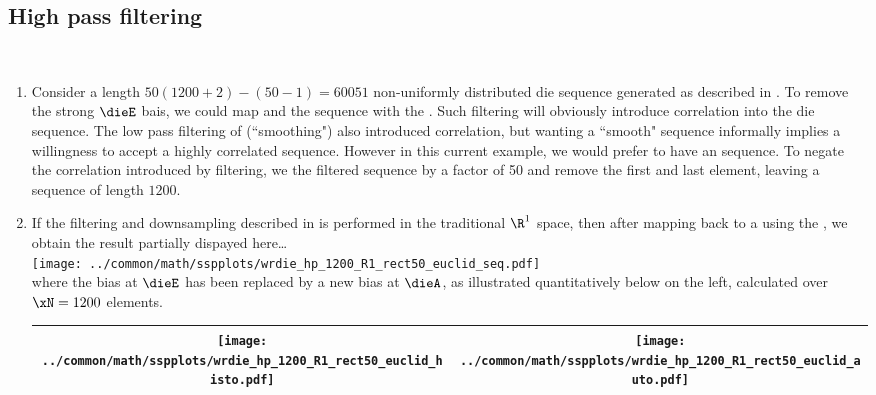 \subsection{High pass filtering}
\label{sec:hp}
\begin{example}
\label{ex:wrdie_hp}
\mbox{}\\
\begin{enumerate}
  \item \label{item:wrdie_hp_R1_rect50}
        Consider a length $50(1200+2)-(50-1)=60051$ non-uniformly distributed die sequence generated as
        described in .
        To remove the strong $\dieE$ bais, we could map and   the sequence with the 
         .
        Such filtering will obviously introduce correlation into the die sequence. 
        The low pass filtering of  (``smoothing") also introduced correlation,
        but wanting a ``smooth" sequence informally implies a willingness to accept a highly correlated sequence.
        However in this current example, we would prefer to have an  sequence.
        To negate the correlation introduced by filtering, 
        we   the filtered sequence by a factor of 50 and
        remove the first and last element, leaving a sequence of length $1200$.

  \item \label{item:wrdie_hp_R1_rect50_euclid}
        If the filtering and downsampling described in  
        is performed in the traditional $\R^1$ space,
        then after mapping back to a  using the ,
        we obtain the result partially dispayed here\ldots
          \\\texttt{[image: ../common/math/sspplots/wrdie\_hp\_1200\_R1\_rect50\_euclid\_seq.pdf]}\\
        where the bias at $\dieE$ has been replaced by a new bias at $\dieA$, 
        as illustrated quantitatively below on the left, 
        calculated over $\xN=1200$ elements. 
          \\\begin{tabular}{|>{\scs}c|>{\scs}c|}
               \hline
               \texttt{[image: ../common/math/sspplots/wrdie\_hp\_1200\_R1\_rect50\_euclid\_histo.pdf]}
              &\texttt{[image: ../common/math/sspplots/wrdie\_hp\_1200\_R1\_rect50\_euclid\_auto.pdf]}
             \\\hline
          \end{tabular}


\end{enumerate}
\end{example}
